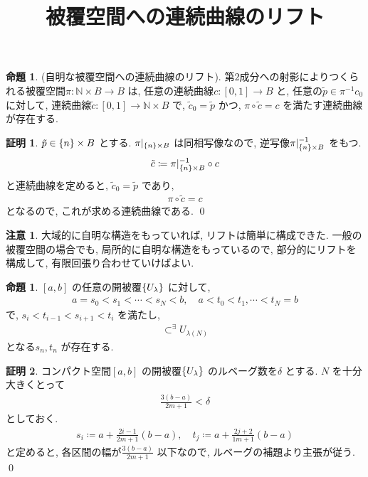 \documentclass[10pt, fleqn, label-section=none]{bxjsarticle}
\title{被覆空間への連続曲線のリフト}
\date{}
\author{}
\theoremstyle{definition}
\newtheorem{prop}[dfn]{命題}
\newtheorem*{pf*}{証明}
\newtheorem{remark}[dfn]{注意}
\newcommand{\cbra}[1]{\mleft\{#1\mright\}}
\renewcommand{\;}{\, ; \,}
\begin{document}
\maketitle

\section{}

\begin{prop}(自明な被覆空間への連続曲線のリフト). 第$2$成分への射影によりつくられる被覆空間$\pi: \mathbb N \times B \rightarrow B$ は, 
任意の連続曲線$c: [0, 1] \rightarrow B$ と, 任意の$\tilde p \in \pi^{-1} c_0$ に対して, 
連続曲線$\tilde c: [0,1] \rightarrow \mathbb N \times B$ で,  $\tilde c_ 0= \tilde p$ かつ, $\pi \circ \tilde c = c$ を満たす連続曲線が存在する.

\end{prop}
\begin{pf*}$\tilde p \in \cbra{n} \times B$ とする. $\pi | _{\cbra{n} \times B} $ は同相写像なので, 逆写像$\pi | _{\cbra{n} \times B} ^{-1}$ をもつ. 
\begin{align*} \tilde c \coloneqq \pi | _{\cbra{n} \times B} ^{-1} \circ c \end{align*}
と連続曲線を定めると, $\tilde c_ 0 = \tilde p$ であり, 
\begin{align*}  \pi \circ \tilde c =  c\end{align*}
となるので, これが求める連続曲線である. 
\qed
\end{pf*}

\begin{remark}
大域的に自明な構造をもっていれば, リフトは簡単に構成できた. 
一般の被覆空間の場合でも, 局所的に自明な構造をもっているので, 部分的にリフトを構成して, 有限回張り合わせていけばよい. 
\end{remark}



\begin{prop}$[a,b]$ の任意の開被覆$\cbra{U_\lambda}$ に対して, 
\begin{align*} a = s_0 < s_1 < \cdots < s_N < b, \quad a < t_0 < t_1, \cdots < t_N = b \end{align*}
で, $s_i < t_{i-1} < s_{i+1} < t_i$ を満たし, 
\begin{align*} [s_0, t_0) \subset ^\exists U_{\lambda(0)}, (s_1, t_1) \subset ^\exists U_{\lambda(1)}, \ldots , (s_N, t_N] \subset ^\exists U_{\lambda(N)}  \end{align*}
となる$s_n, t_n$ が存在する.
\end{prop}
\begin{pf*}
コンパクト空間$[a, b]$ の開被覆$\cbra{U_\lambda}$ のルベーグ数を$\delta$ とする. $N$ を十分大きくとって
\begin{align*} \frac{3(b-a)}{2m + 1} < \delta  \end{align*}
としておく. 
\begin{align*} s_i \coloneqq a + \frac{2i -1}{2m + 1} (b-a), \quad t_j \coloneqq a + \frac{2j + 2}{1m + 1}(b-a) \end{align*}
と定めると, 各区間の幅が$\frac{3(b-a)}{2m + 1}$ 以下なので, ルベーグの補題より主張が従う.
\qed
\end{pf*}
\end{document}
